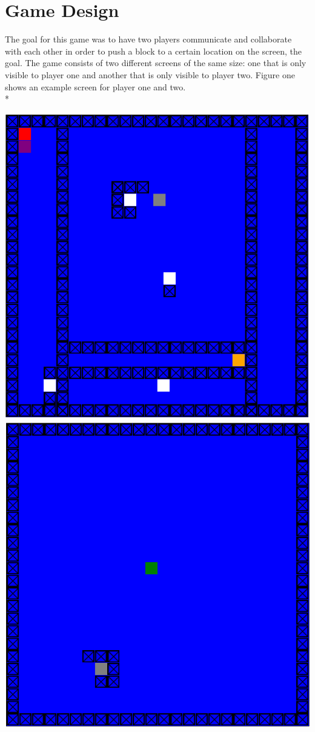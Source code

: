 \section{Game Design}

The goal for this game was to have two players communicate and collaborate with each other in order to push a block to a certain location on the screen, the goal. The game consists of two different screens of the same size: one that is only visible to player one and another that is only visible to player two. Figure one shows an example screen for player one and two. 
\\*

\includegraphics[scale=0.27]{playerview1.png} 
\includegraphics[scale=0.27]{playerview2.png}
 	 
